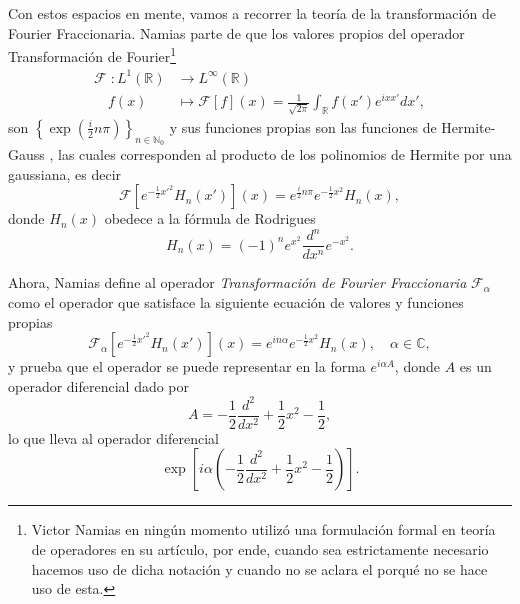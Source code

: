         Con estos espacios en mente, vamos a recorrer la teoría de la transformación de Fourier Fraccionaria. Namias parte de que los valores propios del operador Transformación de Fourier\footnote{Victor Namias en ningún momento utilizó una formulación formal en teoría de operadores en su artículo, por ende, cuando sea estrictamente necesario hacemos uso de dicha notación y cuando no se aclara el porqué no se hace uso de esta.}
        \begin{equation}
            \begin{split}
                \mathcal{F}\;:L^1\left(\mathbb{R}\right) & \longrightarrow L^\infty\left(\mathbb{R}\right)\\
                \quad f(x) & \longmapsto \mathcal{F}\left[f\right](x) = \frac{1}{\sqrt{2\pi}}\int_{\mathbb{R}}f(x')e^{ixx'}dx',
            \end{split}
        \end{equation}
        son $\left\{\exp\left(\frac{i}{2}n\pi \right) \right\}_{n\in\mathbb{N}_0}$ y sus funciones propias son las funciones de Hermite-Gauss \citep{namias1980fractional,szego1975orthogonal}, las cuales corresponden al producto de los polinomios de Hermite por una gaussiana, es decir
        \begin{equation*}
            \mathcal{F}\left[ e^{-\frac{1}{2}x'^2}H_n(x') \right](x) = e^{\frac{i}{2}n\pi} e^{-\frac{1}{2}x^2}H_n(x),
        \end{equation*}
        donde $H_n(x)$ obedece a la fórmula de Rodrigues \citep{wyld2020mathematical}
        \begin{equation*}
            H_n(x) = \left(-1\right)^n e^{x^2} \frac{d^n}{dx^n} e^{-x^2}.
        \end{equation*}

        Ahora, Namias define al operador \textit{Transformación de Fourier Fraccionaria} $\mathcal{F}_\alpha$ como el operador que satisface la siguiente ecuación de valores y funciones propias
        \begin{equation}\label{eq:Cap2NamiasAutoval}
            \mathcal{F}_\alpha \left[ e^{-\frac{1}{2}x'^2}H_n(x')  \right](x) = e^{in\alpha} e^{-\frac{1}{2}x^2}H_n(x), \quad \alpha \in \mathbb{C},
        \end{equation}
        y prueba que el operador se puede representar en la forma $e^{i\alpha A}$, donde $A$ es un operador diferencial dado por
        \begin{equation}
            A = -\frac{1}{2}\frac{d^2}{dx^2} + \frac{1}{2}x^2 - \frac{1}{2},
        \end{equation}
        lo que lleva al operador diferencial
        \begin{equation}\label{eq:Cap2FourierExp1D}
            \exp\left[ i\alpha \left( -\frac{1}{2}\frac{d^2}{dx^2} + \frac{1}{2}x^2 - \frac{1}{2} \right) \right].
        \end{equation}

